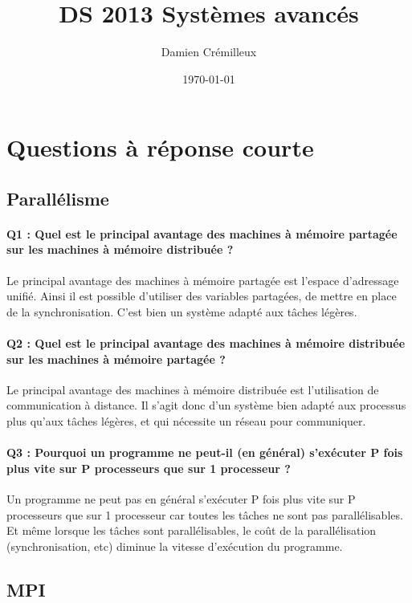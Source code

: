 \documentclass[a4paper]{article}
\begin{document}
\title{DS 2013 Systèmes avancés}
\author{Damien Crémilleux}
\date{\today}

\maketitle

\section{Questions à réponse courte}

\subsection{Parallélisme}

\paragraph{Q1 : Quel est le principal avantage des machines à mémoire partagée sur les machines à mémoire distribuée ?}
Le principal avantage des machines à mémoire partagée est l'espace d'adressage unifié. Ainsi il est possible d'utiliser des variables partagées, de mettre en place de la synchronisation. C'est bien un système adapté aux tâches légères.

\paragraph{Q2 : Quel est le principal avantage des machines à mémoire distribuée sur les machines à mémoire partagée ?}
Le principal avantage des machines à mémoire distribuée est l'utilisation de communication à distance. Il s'agit donc d'un système bien adapté aux processus plus qu'aux tâches légères, et qui nécessite un réseau pour communiquer.

\paragraph{Q3 : Pourquoi un programme ne peut-il (en général) s'exécuter P fois plus vite sur P processeurs que sur 1 processeur ?}
Un programme ne peut pas en général s'exécuter P fois plus vite sur P processeurs que sur 1 processeur car toutes les tâches ne sont pas parallélisables. Et même lorsque les tâches sont parallélisables, le coût de la parallélisation (synchronisation, etc) diminue la vitesse d'exécution du programme.

\subsection{MPI}
\end{document}
